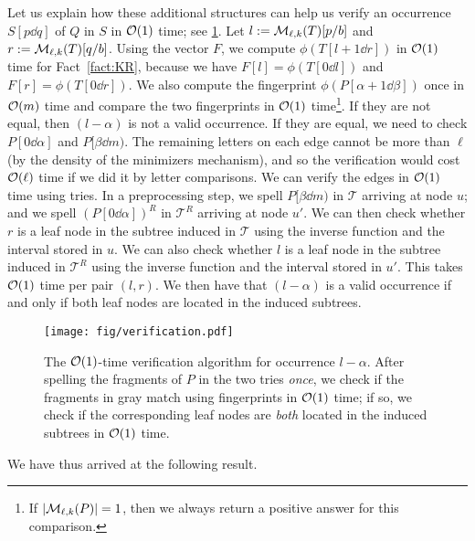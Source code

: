 Let us explain how these additional structures can help us verify an occurrence
$S[p\dd q]$ of $Q$ in $S$ in $\mathcal{O}(1)$ time; see \cref{fig:verification}. Let $l:=\mathcal{M}_{\ell,k}(T)[p/b]$ and $r:=\mathcal{M}_{\ell,k}(T)[q/b]$.
Using the vector $F$,
we compute $\phi(T[l+1\dd r])$ in $\mathcal{O}(1)$ time for Fact~\ref{fact:KR}, because we have
$F[l]=\phi(T[0\dd l])$ and $F[r]=\phi(T[0\dd r])$.
We also compute the
fingerprint $\phi(P[\alpha+1 \dd \beta])$
once in $\mathcal{O}(m)$ time and compare the two fingerprints in $\mathcal{O}(1)$ time\footnote{If $|\mathcal{M}_{\ell,k}(P)|=1$, then we always return a positive answer for this comparison.}. If they are not equal, then $(l-\alpha)$ is not a valid occurrence. If they are equal, we need to check $P[0\dd \alpha]$ and $P[\beta\dd m)$.
The remaining letters on each edge cannot be more than $\ell$ (by the density of the minimizers mechanism), and so the verification would cost $\mathcal{O}(\ell)$ time if we did it by letter comparisons. We can verify the edges in $\mathcal{O}(1)$ time using tries. In a preprocessing step, we spell $P[\beta\dd m)$ in $\mathcal{T}$ arriving at node $u$; and we spell $(P[0\dd \alpha])^R$ in $\mathcal{T}^R$ arriving at node $u'$. We can then check whether $r$ is a leaf node in the subtree induced in $\mathcal{T}$ using the inverse function and the interval stored in $u$. We can also check whether $l$ is a leaf node in the subtree induced in $\mathcal{T}^R$ using the inverse function and the interval stored in $u'$. This takes $\mathcal{O}(1)$ time per pair $(l,r)$.
We then have that $(l-\alpha)$ is a valid occurrence if and only if both leaf nodes are located in the induced subtrees. 

\begin{figure}
    \centering
    \texttt{[image: fig/verification.pdf]}
    \caption{The $\mathcal{O}(1)$-time verification algorithm for occurrence $l-\alpha$. After spelling the fragments of $P$ in the two tries \emph{once}, we check if the fragments in gray match using fingerprints in $\mathcal{O}(1)$ time; if so, we check if the corresponding leaf nodes are \emph{both} located in the induced subtrees in $\mathcal{O}(1)$ time.}
    \label{fig:verification}
\end{figure}

\return
We have thus arrived at the following result.



